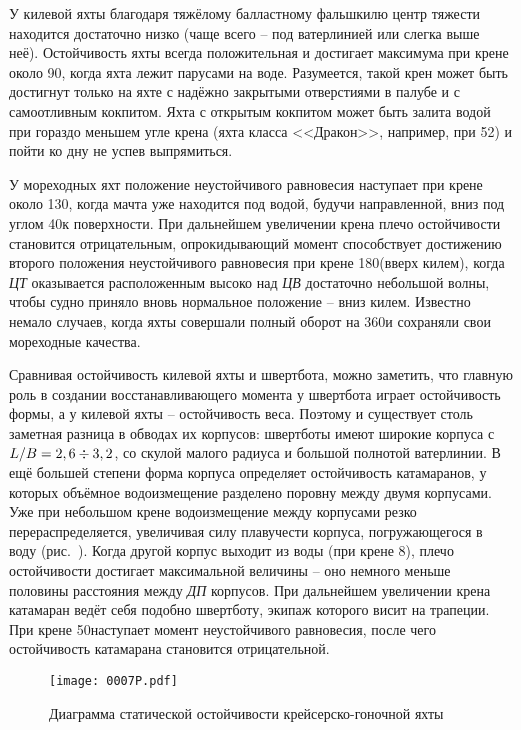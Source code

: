 У килевой яхты благодаря тяжёлому балластному фальшкилю центр тяжести
находится достаточно низко (чаще всего \--- под ватерлинией или слегка
выше неё). Остойчивость яхты всегда положительная и достигает
максимума при крене около 90\gr, когда яхта лежит парусами на
воде. Разумеется, такой крен может быть достигнут только на яхте с
надёжно закрытыми отверстиями в палубе и с самоотливным кокпитом. Яхта
с открытым кокпитом может быть залита водой при гораздо меньшем угле
крена (яхта класса <<Дракон>>, например, при 52\gr) и пойти ко дну не
успев выпрямиться.

У мореходных яхт положение неустойчивого равновесия наступает при
крене около 130\gr, когда мачта уже находится под водой, будучи
направленной, вниз под углом 40\gr к поверхности. При дальнейшем
увеличении крена плечо остойчивости становится отрицательным,
опрокидывающий момент способствует достижению второго положения
неустойчивого равновесия при крене 180\gr (вверх килем), когда
\textit{ЦТ} оказывается расположенным высоко над \textit{ЦВ}
достаточно небольшой волны, чтобы судно приняло вновь нормальное
положение \--- вниз килем. Известно немало случаев, когда яхты
совершали полный оборот на 360\gr и сохраняли свои мореходные
качества.

Сравнивая остойчивость килевой яхты и швертбота, можно заметить, что
главную роль в создании восстанавливающего момента у швертбота играет
остойчивость формы, а у килевой яхты \--- остойчивость веса. Поэтому и
существует столь заметная разница в обводах их корпусов: швертботы
имеют широкие корпуса с $L/B = 2,6 \div 3,2$, со скулой малого
радиуса и большой полнотой ватерлинии. В ещё большей степени форма
корпуса определяет остойчивость катамаранов, у которых объёмное
водоизмещение разделено поровну между двумя корпусами. Уже при
небольшом крене водоизмещение между корпусами резко
перераспределяется, увеличивая силу плавучести корпуса, погружающегося
в воду (рис.~). Когда другой корпус выходит из воды (при крене
8\gr), плечо остойчивости достигает максимальной величины \---
оно немного меньше половины расстояния между \textit{ДП} корпусов. При
дальнейшем увеличении крена катамаран ведёт себя подобно швертботу,
экипаж которого висит на трапеции. При крене 50\gr наступает
момент неустойчивого равновесия, после чего остойчивость катамарана
становится отрицательной.

\begin{figure*}[htb]
  \centering
  \texttt{[image: 0007P.pdf]}
  \caption{Диаграмма статической остойчивости крейсерско-гоночной яхты}
  \label{fig:7}
\end{figure*}

